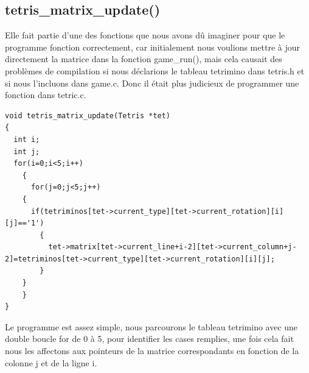 \documentclass[a4paper,10p]{report}
\begin{document}
\subsection{tetris\_matrix\_update()}
\label{tetris_matrix_update}
Elle fait partie d'une des fonctions que nous avons dû imaginer pour que le programme fonction correctement, car initialement nous voulions mettre à jour directement la matrice dans la fonction game\_run(), mais cela causait des problèmes de compilation si nous déclarions le tableau tetrimino dans tetris.h et si nous l'incluons dans game.c. Donc il était plus judicieux de programmer une fonction dans tetric.c.
\begin{lstlisting}
void tetris_matrix_update(Tetris *tet)
{
  int i;
  int j;
  for(i=0;i<5;i++)
    {
      for(j=0;j<5;j++)
	{
	  if(tetriminos[tet->current_type][tet->current_rotation][i][j]=='1')
	    {
	      tet->matrix[tet->current_line+i-2][tet->current_column+j-2]=tetriminos[tet->current_type][tet->current_rotation][i][j];
	    }
	}
    }
}
\end{lstlisting}
Le programme est assez simple, nous parcourons le tableau tetrimino avec une double boucle for de 0 à 5, pour identifier les cases remplies, une fois cela fait nous les affectons aux pointeurs de la matrice correspondants en fonction de la colonne j et de la ligne i.
\end{document}
